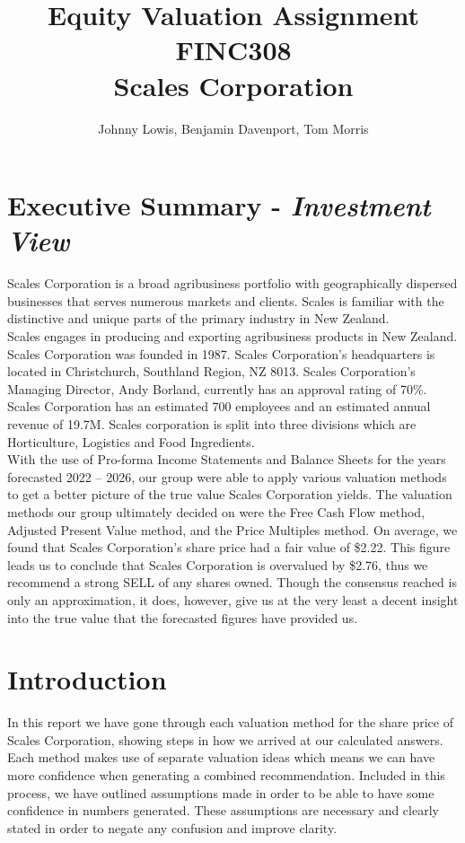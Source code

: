 \documentclass{article}
\title{Equity Valuation Assignment \\ FINC308 \\ Scales Corporation}
\author{Johnny Lowis, Benjamin Davenport, Tom Morris}
\begin{document}
\maketitle
\newpage

\tableofcontents
\newpage

\section{Executive Summary - \textit{Investment View}}
Scales Corporation is a broad agribusiness portfolio with geographically dispersed businesses that serves numerous markets and clients. Scales is familiar with the distinctive and unique parts of the primary industry in New Zealand. \\

Scales engages in producing and exporting agribusiness products in New Zealand. Scales Corporation was founded in 1987. Scales Corporation's headquarters is located in Christchurch, Southland Region, NZ 8013. Scales Corporation's Managing Director, Andy Borland, currently has an approval rating of 70\%. Scales Corporation has an estimated 700 employees and an estimated annual revenue of 19.7M. Scales corporation is split into three divisions which are Horticulture, Logistics and Food Ingredients. \\

With the use of Pro-forma Income Statements and Balance Sheets for the years forecasted 2022 – 2026, our group were able to apply various valuation methods to get a better picture of the true value Scales Corporation yields. The valuation methods our group ultimately decided on were the Free Cash Flow method, Adjusted Present Value method, and the Price Multiples method. On average, we found that Scales Corporation’s share price had a fair value of \$2.22. This figure leads us to conclude that Scales Corporation is overvalued by \$2.76, thus we recommend a strong SELL of any shares owned. Though the consensus reached is only an approximation, it does, however, give us at the very least a decent insight into the true value that the forecasted figures have provided us. 

\section{Introduction}
In this report we have gone through each valuation method for the share price of Scales Corporation, showing steps in how we arrived at our calculated answers. Each method makes use of separate valuation ideas which means we can have more confidence when generating a combined recommendation. Included in this process, we have outlined assumptions made in order to be able to have some confidence in numbers generated. These assumptions are necessary and clearly stated in order to negate any confusion and improve clarity.\\
\end{document}
